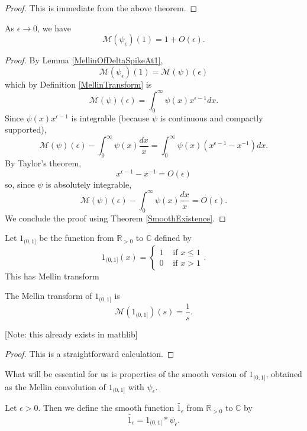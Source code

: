 \begin{proof}\leanok
{}
This is immediate from the above theorem.
\end{proof}


\begin{lemma}\label{MellinOfDeltaSpikeAt1_asymp}
\leanok
As $\epsilon\to 0$, we have
$$\mathcal{M}(\psi_\epsilon)(1) = 1+O(\epsilon).$$
\end{lemma}


\begin{proof}
By Lemma \ref{MellinOfDeltaSpikeAt1},
$$
  \mathcal M(\psi_\epsilon)(1)=\mathcal M(\psi)(\epsilon)
$$
which by Definition \ref{MellinTransform} is
$$
  \mathcal M(\psi)(\epsilon)=\int_0^\infty\psi(x)x^{\epsilon-1}dx
  .
$$
Since $\psi(x) x^{\epsilon-1}$ is integrable (because $\psi$ is continuous and compactly supported),
$$
  \mathcal M(\psi)(\epsilon)-\int_0^\infty\psi(x)\frac{dx}x=\int_0^\infty\psi(x)(x^{\epsilon-1}-x^{-1})dx
  .
$$
By Taylor's theorem,
$$
  x^{\epsilon-1}-x^{-1}=O(\epsilon)
$$
so, since $\psi$ is absolutely integrable,
$$
  \mathcal M(\psi)(\epsilon)-\int_0^\infty\psi(x)\frac{dx}x=O(\epsilon)
  .
$$
We conclude the proof using Theorem \ref{SmoothExistence}.
\end{proof}


Let $1_{(0,1]}$ be the function from $\mathbb{R}_{>0}$ to $\mathbb{C}$ defined by
$$1_{(0,1]}(x) = \begin{cases}
1 & \text{ if }x\leq 1\\
0 & \text{ if }x>1
\end{cases}.$$
This has Mellin transform
\begin{theorem}[MellinOf1]\label{MellinOf1}\leanok
The Mellin transform of $1_{(0,1]}$ is
$$\mathcal{M}(1_{(0,1]})(s) = \frac{1}{s}.$$
\end{theorem}
[Note: this already exists in mathlib]


\begin{proof}\leanok
{}
This is a straightforward calculation.
\end{proof}


What will be essential for us is properties of the smooth version of $1_{(0,1]}$, obtained as the
 Mellin convolution of $1_{(0,1]}$ with $\psi_\epsilon$.
\begin{definition}[Smooth1]\label{Smooth1}
\leanok
Let $\epsilon>0$. Then we define the smooth function $\widetilde{1_{\epsilon}}$ from
$\mathbb{R}_{>0}$ to $\mathbb{C}$ by
$$\widetilde{1_{\epsilon}} = 1_{(0,1]}\ast\psi_\epsilon.$$
\end{definition}


